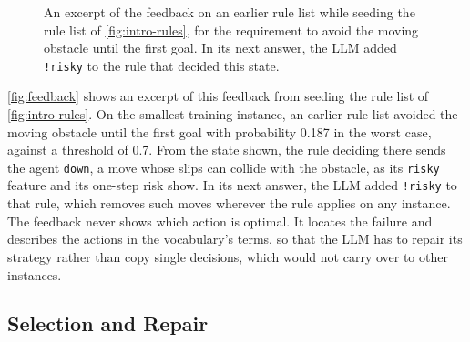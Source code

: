 \begin{figure}[t]
\centering
{}
\caption{An excerpt of the feedback on an earlier rule list while seeding the rule list of \autoref{fig:intro-rules}, for the requirement to avoid the moving obstacle until the first goal. In its next answer, the LLM added \texttt{!risky} to the rule that decided this state.}
\label{fig:feedback}
\end{figure}

\autoref{fig:feedback} shows an excerpt of this feedback from seeding the rule list of \autoref{fig:intro-rules}.
On the smallest training instance, an earlier rule list avoided the moving obstacle until the first goal with probability 0.187 in the worst case, against a threshold of 0.7.
From the state shown, the rule deciding there sends the agent \texttt{down}, a move whose slips can collide with the obstacle, as its \texttt{risky} feature and its one-step risk show.
In its next answer, the LLM added \texttt{!risky} to that rule, which removes such moves wherever the rule applies on any instance.
The feedback never shows which action is optimal.
It locates the failure and describes the actions in the vocabulary's terms, so that the LLM has to repair its strategy rather than copy single decisions, which would not carry over to other instances.

\subsection{Selection and Repair}
\label{sec:selection}

